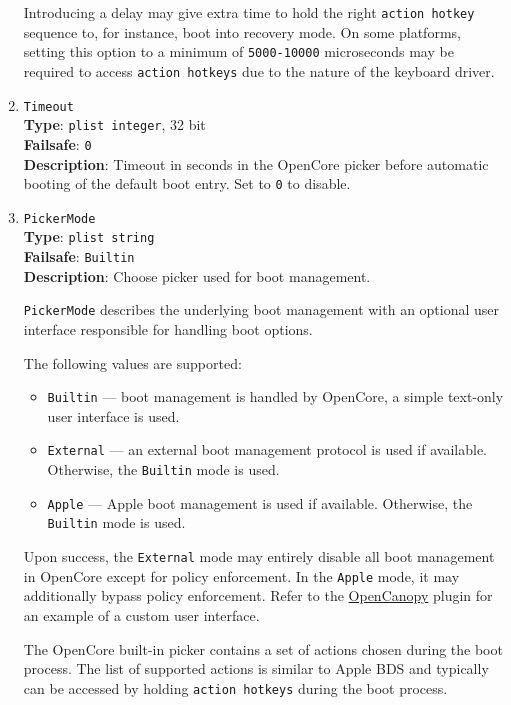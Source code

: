 \documentclass[]{article}
\providecommand{\tightlist}{%
  \setlength{\itemsep}{0pt}\setlength{\parskip}{0pt}}
\begin{document}
\begin{enumerate}
  Introducing a delay may give extra time to hold the right \texttt{action hotkey}
  sequence to, for instance, boot into recovery mode. On some platforms, setting this
  option to a minimum of \texttt{5000-10000} microseconds may be required to access
  \texttt{action hotkeys} due to the nature of the keyboard driver.

\item
  \texttt{Timeout}\\
  \textbf{Type}: \texttt{plist\ integer}, 32 bit\\
  \textbf{Failsafe}: \texttt{0}\\
  \textbf{Description}: Timeout in seconds in the OpenCore picker before
  automatic booting of the default boot entry. Set to \texttt{0} to disable.

\item
  \texttt{PickerMode}\\
  \textbf{Type}: \texttt{plist\ string}\\
  \textbf{Failsafe}: \texttt{Builtin}\\
  \textbf{Description}: Choose picker used for boot management.

  \texttt{PickerMode} describes the underlying boot management with
  an optional user interface responsible for handling boot options.

  The following values are supported:

  \begin{itemize}
  \tightlist
  \item \texttt{Builtin} --- boot management is handled by OpenCore, a simple
  text-only user interface is used.
  \item \texttt{External} --- an external boot management protocol is used
  if available. Otherwise, the \texttt{Builtin} mode is used.
  \item \texttt{Apple} --- Apple boot management is used if available.
  Otherwise, the \texttt{Builtin} mode is used.
  \end{itemize}

  Upon success, the \texttt{External} mode may entirely disable all boot management
  in OpenCore except for policy enforcement. In the \texttt{Apple} mode, it may
  additionally bypass policy enforcement. Refer to the \hyperref[ueficanopy]{OpenCanopy}
  plugin for an example of a custom user interface.

  The OpenCore built-in picker contains a set of actions chosen during the boot process.
  The list of supported actions is similar to Apple BDS and typically can be accessed by
  holding \texttt{action hotkeys} during the boot process.


\end{enumerate}
\end{document}
